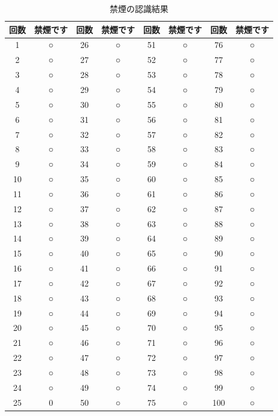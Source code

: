\documentclass[12pt,oneside]{sotsuken_paper}
\begin{document}
\begin{table}[htb]
\begin{center}
\caption{禁煙の認識結果}
\begin{tabular}{|c|c|c|c|c|c|c|c|}\hline
回数&禁煙です&回数&禁煙です&回数&禁煙です&回数&禁煙です\\\hline
1&○&26&○&51&○&76&○\\\hline
2&○&27&○&52&○&77&○\\\hline
3&○&28&○&53&○&78&○\\\hline
4&○&29&○&54&○&79&○\\\hline
5&○&30&○&55&○&80&○\\\hline
6&○&31&○&56&○&81&○\\\hline
7&○&32&○&57&○&82&○\\\hline
8&○&33&○&58&○&83&○\\\hline
9&○&34&○&59&○&84&○\\\hline
10&○&35&○&60&○&85&○\\\hline
11&○&36&○&61&○&86&○\\\hline
12&○&37&○&62&○&87&○\\\hline
13&○&38&○&63&○&88&○\\\hline
14&○&39&○&64&○&89&○\\\hline
15&○&40&○&65&○&90&○\\\hline
16&○&41&○&66&○&91&○\\\hline
17&○&42&○&67&○&92&○\\\hline
18&○&43&○&68&○&93&○\\\hline
19&○&44&○&69&○&94&○\\\hline
20&○&45&○&70&○&95&○\\\hline
21&○&46&○&71&○&96&○\\\hline
22&○&47&○&72&○&97&○\\\hline
23&○&48&○&73&○&98&○\\\hline
24&○&49&○&74&○&99&○\\\hline
25&0&50&○&75&○&100&○
\\\hline
\end{tabular}
\label{tab:nosmokerecogresult}
\end{center}
\end{table}
\end{document}
